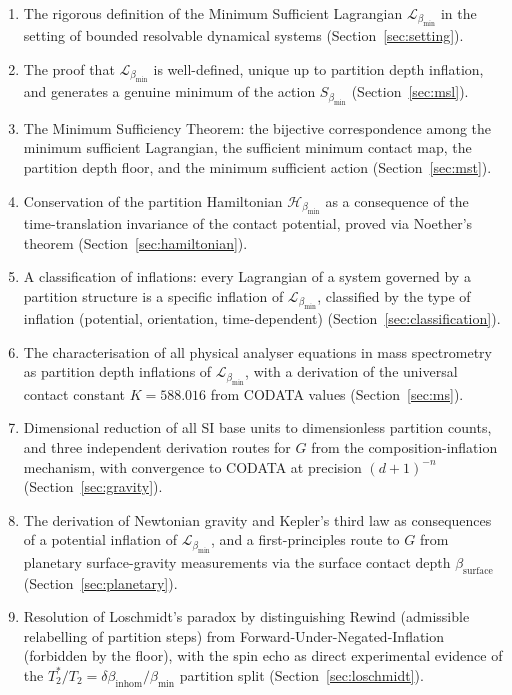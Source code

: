 \documentclass[12pt, a4paper]{article}
\theoremstyle{plain}
\theoremstyle{definition}
\theoremstyle{remark}
\newcommand{\bmin}{\beta_{\min}}
\newcommand{\Lmin}{\mathcal{L}_{\bmin}}
\newcommand{\Smin}{S_{\bmin}}
\newcommand{\Hmin}{\mathcal{H}_{\bmin}}
\begin{document}
\begin{enumerate}[label=(\roman*)]
\item The rigorous definition of the Minimum Sufficient Lagrangian $\Lmin$ in
  the setting of bounded resolvable dynamical systems
  (Section~\ref{sec:setting}).

\item The proof that $\Lmin$ is well-defined, unique up to partition depth
  inflation, and generates a genuine minimum of the action $\Smin$
  (Section~\ref{sec:msl}).

\item The Minimum Sufficiency Theorem: the bijective correspondence among the
  minimum sufficient Lagrangian, the sufficient minimum contact map, the
  partition depth floor, and the minimum sufficient action
  (Section~\ref{sec:mst}).

\item Conservation of the partition Hamiltonian $\Hmin$ as a consequence of
  the time-translation invariance of the contact potential, proved via
  Noether's theorem (Section~\ref{sec:hamiltonian}).

\item A classification of inflations: every Lagrangian of a system governed by
  a partition structure is a specific inflation of $\Lmin$, classified by the
  type of inflation (potential, orientation, time-dependent)
  (Section~\ref{sec:classification}).

\item The characterisation of all physical analyser equations in mass
  spectrometry as partition depth inflations of $\Lmin$, with a derivation of
  the universal contact constant $K = 588.016$ from CODATA values
  (Section~\ref{sec:ms}).

\item Dimensional reduction of all SI base units to dimensionless partition
  counts, and three independent derivation routes for $G$ from the
  composition-inflation mechanism, with convergence to CODATA at precision
  $(d+1)^{-n}$ (Section~\ref{sec:gravity}).

\item The derivation of Newtonian gravity and Kepler's third law as
  consequences of a potential inflation of $\Lmin$, and a first-principles
  route to $G$ from planetary surface-gravity measurements via the surface
  contact depth $\beta_{\mathrm{surface}}$ (Section~\ref{sec:planetary}).

\item Resolution of Loschmidt's paradox by distinguishing Rewind (admissible
  relabelling of partition steps) from Forward-Under-Negated-Inflation
  (forbidden by the floor), with the spin echo as direct experimental evidence
  of the $T_2^*/T_2 = \delta\beta_{\mathrm{inhom}}/\bmin$ partition split
  (Section~\ref{sec:loschmidt}).
\end{enumerate}
\end{document}
